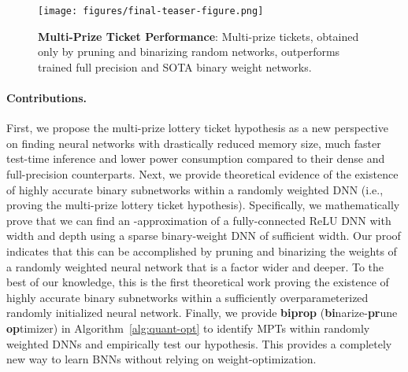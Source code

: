 \documentclass{article} \usepackage{iclr2021_conference,times}
\begin{document}
\iffalse
\noindent\fcolorbox{black}{lightgray!60}{\begin{minipage}{0.98\textwidth}
\noindent \textbf{Multi-Prize Lottery Ticket Hypothesis.} \emph{A sufficiently over-parameterized neural network with random weights contains several subnetworks (winning tickets) that (a) have comparable accuracy to a dense target network with learned weights (prize 1), (b) do not require any further training to achieve prize 1 (prize 2), and (c) is robust to extreme forms of quantization (i.e., binary weights and/or activation) (prize 3).}
\end{minipage}}
\fi

\begin{figure}[!t]
    \centering
    \texttt{[image: figures/final-teaser-figure.png]}
    \caption{{\bfseries Multi-Prize Ticket Performance}: Multi-prize tickets, obtained only by pruning and binarizing random networks, outperforms trained full precision and SOTA binary weight networks.}
    \label{fig:teaser-figure}
\end{figure}

\paragraph{Contributions.}
First, we propose the multi-prize lottery ticket hypothesis as a new perspective on finding neural networks with drastically reduced memory size, much faster test-time inference and lower power consumption compared to their dense and full-precision counterparts. 
Next, we provide theoretical evidence of the existence of highly accurate binary subnetworks within a randomly weighted DNN (i.e., proving the multi-prize lottery ticket hypothesis). 
Specifically, we mathematically prove that we can find an -approximation of a fully-connected ReLU DNN with width  and depth  using a sparse binary-weight DNN of sufficient width. Our proof indicates that this can be accomplished by pruning and binarizing the weights of a randomly weighted neural network that is a factor  wider and  deeper.
To the best of our knowledge, this is the first theoretical work proving the existence of highly accurate binary subnetworks within a sufficiently overparameterized randomly initialized neural network.
Finally, we provide \textbf{biprop} (\textbf{bi}narize-\textbf{pr}une \textbf{op}timizer) in Algorithm~\ref{alg:quant-opt} to identify MPTs within randomly weighted DNNs and empirically test our hypothesis. This provides a completely new way to learn BNNs without relying on weight-optimization.
\end{document}
